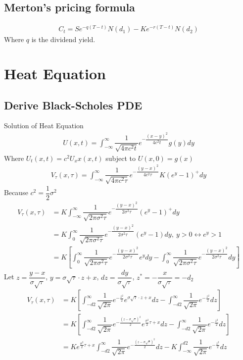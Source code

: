 \documentclass[12pt]{article}
\begin{document}
\subsection*{Merton's pricing formula}
\begin{align*}
    C_t = Se^{-q(T-t)}N(d_1) - Ke^{-r(T-t)}N(d_2)
\end{align*}
Where $q$ is the dividend yield.\\
\section{Heat Equation}
\subsection*{Derive Black-Scholes PDE}
Solution of Heat Equation
\begin{align*}
    U(x,t) = \int_{-\infty}^{\infty} \dfrac{1}{\sqrt{4\pi c^2 t}}e^{-\dfrac{(x-y)^2}{4c^2t}}g(y)dy
\end{align*}
Where $U_t(x,t) = c^2 U_xx(x,t)$ subject to $U(x,0) = g(x)$
\begin{align*}
    V_{\tau}(x,\tau) = \int_{-\infty}^{\infty} \dfrac{1}{\sqrt{4\pi c^2 \tau}}e^{-\dfrac{(y-x)^2}{4c^2\tau}}K(e^y-1)^{+}dy
\end{align*}
Because $c^2 = \dfrac{1}{2}\sigma^2$
\begin{align*}
    V_{\tau}(x,\tau) & = K\int_{-\infty}^{\infty} \dfrac{1}{\sqrt{2\pi \sigma^2 \tau}}e^{-\dfrac{(y-x)^2}{2\sigma^2\tau}}(e^y-1)^{+}dy\\
    & = K\int_{0}^{\infty} \dfrac{1}{\sqrt{2\pi \sigma^2 \tau}}e^{-\dfrac{(y-x)^2}{2\sigma^2\tau}}(e^y-1)dy,\ y>0\leftrightarrow e^y>1\\
    & = K\left[\int_{0}^{\infty} \dfrac{1}{\sqrt{2\pi \sigma^2 \tau}}e^{-\dfrac{(y-x)^2}{2\sigma^2\tau}}e^y dy - \int_{0}^{\infty} \dfrac{1}{\sqrt{2\pi \sigma^2 \tau}}e^{-\dfrac{(y-x)^2}{2\sigma^2\tau}} dy\right]
\end{align*} 
Let $z = \dfrac{y-x}{\sigma\sqrt{\tau}}$, $y = \sigma\sqrt{\tau}\cdot z + x$, $dz = \dfrac{dy}{\sigma\sqrt{\tau}}$, $z^* = -\dfrac{x}{\sigma\sqrt{\tau}}=-d_2$
\begin{align*}
    V_{\tau}(x,\tau) & = K\left[\int_{-d2}^{\infty} \dfrac{1}{\sqrt{2\pi}}e^{-\frac{z^2}{2}}e^{\sigma\sqrt{\tau}\cdot z+x} dz - \int_{-d2}^{\infty} \dfrac{1}{\sqrt{2\pi}}e^{-\frac{z^2}{2}} dz\right]\\
    & = K\left[\int_{-d2}^{\infty} \dfrac{1}{\sqrt{2\pi}}e^{-\frac{(z-\sigma\sqrt{\tau})^2}{2}}e^{\frac{\sigma^2}{2}\tau+x} dz - \int_{-d2}^{\infty} \dfrac{1}{\sqrt{2\pi}}e^{-\frac{z^2}{2}} dz\right]\\
    & = Ke^{\frac{\sigma^2}{2}\tau+x}\int_{-d2}^{\infty} \dfrac{1}{\sqrt{2\pi}}e^{-\frac{(z-\sigma\sqrt{\tau})^2}{2}} dz - K\int_{-\infty}^{d2} \dfrac{1}{\sqrt{2\pi}}e^{-\frac{z^2}{2}} dz
\end{align*}
\end{document}
